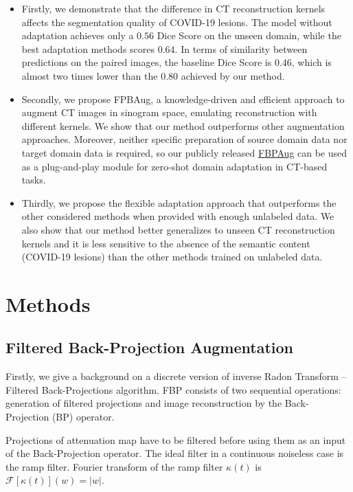 \begin{itemize}
	
	\item Firstly, we demonstrate that the difference in CT reconstruction kernels affects the segmentation quality of COVID-19 lesions. The model without adaptation achieves only a $0.56$ Dice Score on the unseen domain, while the best adaptation methods scores $0.64$. In terms of similarity between predictions on the paired images, the baseline Dice Score is $0.46$, which is almost two times lower than the $0.80$ achieved by our method.
	
	\item Secondly, we propose FPBAug, a knowledge-driven and efficient approach to augment CT images in sinogram space, emulating reconstruction with different kernels. We show that our method outperforms other augmentation approaches. Moreover, neither specific preparation of source domain data nor target domain data is required, so our publicly released \href{https://github.com/STNLd2/FBPAug}{FBPAug} can be used as a plug-and-play module for zero-shot domain adaptation in CT-based tasks.
	
	\item Thirdly, we propose the flexible adaptation approach that outperforms the other considered methods when provided with enough unlabeled data. We also show that our method better generalizes to unseen CT reconstruction kernels and it is less sensitive to the absence of the semantic content (COVID-19 lesions) than the other methods trained on unlabeled data.
	
\end{itemize}


\section{Methods}

\subsection{Filtered Back-Projection Augmentation}


Firstly, we give a background on a discrete version of inverse Radon Transform -- Filtered Back-Projections algorithm. FBP consists of two sequential operations: generation of filtered projections and image reconstruction by the Back-Projection (BP) operator.

Projections of attenuation map have to be filtered before using them as an input of the Back-Projection operator. The ideal filter in a continuous noiseless case is the ramp filter. Fourier transform of the ramp filter $\kappa(t)$ is $\mathcal{F}[\kappa(t)](w) = |w|$.

